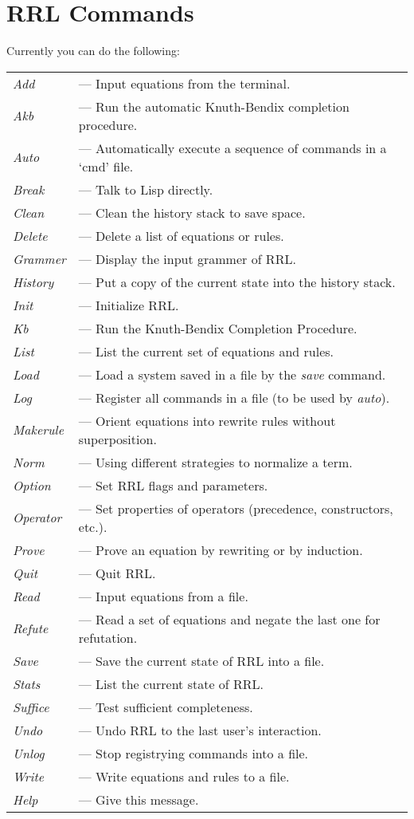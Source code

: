 \chapter{RRL Commands}
\small
\rm
Currently you can do the following:

\begin{tabular}{ll}
{\em Add} & --- Input equations from the terminal.\\
{\em Akb} & --- Run the automatic Knuth-Bendix completion procedure. \\
{\em Auto} & --- Automatically execute a sequence of commands in a `cmd' file.\\
{\em Break} & --- Talk to Lisp directly.\\
{\em Clean} & --- Clean the history stack to save space.\\
{\em Delete} & --- Delete a list of equations or rules.\\
{\em Grammer} & --- Display the input grammer of RRL.\\
{\em History} & --- Put a copy of the current state into the history stack.\\
{\em Init}   & --- Initialize RRL.\\
{\em Kb}     & --- Run the Knuth-Bendix Completion Procedure.\\
{\em List}   & --- List the current set of equations and rules.\\
{\em Load}   & --- Load a system saved in a file by the {\em save} command.\\
{\em Log}    & --- Register all commands in a file (to be used by {\em auto}).\\
{\em Makerule} & --- Orient equations into rewrite rules without superposition. \\
{\em Norm}   & --- Using different strategies to normalize a term.\\
{\em Option} & ---  Set RRL flags and parameters.\\
{\em Operator} & --- Set properties of operators (precedence, constructors, etc.).\\
{\em Prove}  & --- Prove an equation by rewriting or by induction.\\
{\em Quit}   & --- Quit RRL.\\
{\em Read}   & --- Input equations from a file.\\
{\em Refute} & --- Read a set of equations and negate the last one for refutation.\\
{\em Save}   & --- Save the current state of RRL into a file. \\
{\em Stats}  & --- List the current state of RRL. \\
{\em Suffice} & --- Test sufficient completeness.\\
{\em Undo}   & --- Undo RRL to the last user's interaction.\\
{\em Unlog}  & --- Stop registrying commands into a file. \\
{\em Write}  & --- Write equations and rules to a file.\\
{\em Help}   & --- Give this message. 
\end{tabular} 

